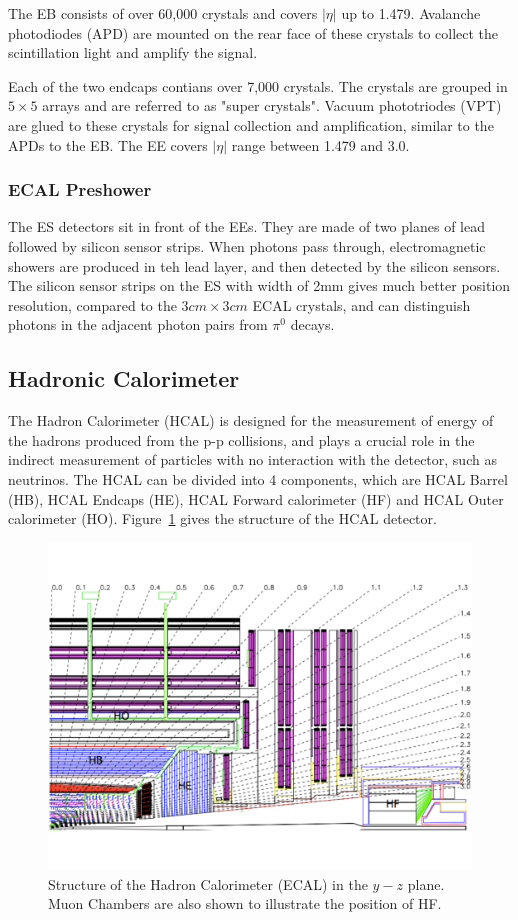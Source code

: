 \vspace{0.3cm}
The EB consists of over 60,000 crystals and covers $|\eta|$ up to 1.479. Avalanche photodiodes (APD) are mounted on the rear face of these crystals to collect the scintillation light and amplify the signal. 

\vspace{0.3cm}
Each of the two endcaps contians over 7,000 crystals. The crystals are grouped in $5\times 5$ arrays and are referred to as "super crystals". Vacuum phototriodes (VPT) are glued to these crystals for signal collection and amplification, similar to the APDs to the EB. The EE covers $|\eta|$ range between 1.479 and 3.0. 

\subsubsection{ECAL Preshower}
The ES detectors sit in front of the EEs. They are made of two planes of lead followed by silicon sensor strips. When photons pass through, electromagnetic showers are produced in teh lead layer, and then detected by the silicon sensors. The silicon sensor strips on the ES with width of 2mm gives much better position resolution, compared to the $3cm\times 3cm$ ECAL crystals, and can distinguish photons in the adjacent photon pairs from $\pi^{0}$ decays.

\subsection{Hadronic Calorimeter} 
The Hadron Calorimeter (HCAL)\cite{lhc_hcaldesign} is designed for the measurement of energy of the hadrons produced from the p-p collisions, and plays a crucial role in the indirect measurement of particles with no interaction with the detector, such as neutrinos. The HCAL can be divided into 4 components, which are HCAL Barrel (HB), HCAL Endcaps (HE), HCAL Forward calorimeter (HF) and HCAL Outer calorimeter (HO). Figure~\ref{fig:lhc_hcaldesign} gives the structure of the HCAL detector.
\begin{figure}[htbp]
\begin{center}
\includegraphics[width=0.7\linewidth]{figures/lhc_hcaldesign.pdf}
\caption{Structure of the Hadron Calorimeter (ECAL) in the $y-z$ plane. Muon Chambers are also shown to illustrate the position of HF.}
\label{fig:lhc_hcaldesign}
\end{center}
\end{figure}


